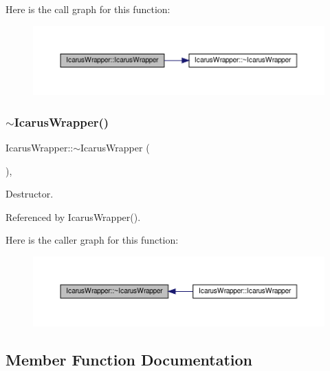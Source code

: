 Here is the call graph for this function\+:
\nopagebreak
\begin{figure}[H]
\begin{center}
\leavevmode
\includegraphics[width=350pt]{dd/dd1/classIcarusWrapper_a43e7335f0e3ae686711124555ea49b47_cgraph}
\end{center}
\end{figure}
\mbox{\label{classIcarusWrapper_ab61d3d697f15b073e141fb2db6c8aba6}} 
\subsubsection{\texorpdfstring{$\sim$\+Icarus\+Wrapper()}{~IcarusWrapper()}}
{\footnotesize\ttfamily Icarus\+Wrapper\+::$\sim$\+Icarus\+Wrapper (\begin{DoxyParamCaption}{ }\end{DoxyParamCaption})\hspace{0.3cm}{\ttfamily [override]}, {\ttfamily [default]}}



Destructor. 



Referenced by Icarus\+Wrapper().

Here is the caller graph for this function\+:
\nopagebreak
\begin{figure}[H]
\begin{center}
\leavevmode
\includegraphics[width=350pt]{dd/dd1/classIcarusWrapper_ab61d3d697f15b073e141fb2db6c8aba6_icgraph}
\end{center}
\end{figure}


\subsection{Member Function Documentation}
\mbox{\label{classIcarusWrapper_a9ea8b4abaa701ca7faca32f40ff6c232}} 
